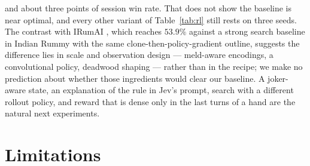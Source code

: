 \documentclass[11pt]{article}
\begin{document}
and about three points of session win rate. That does not show the baseline is near optimal, and every other variant of Table~\ref{tab:rl} still rests on three seeds. The contrast with IRumAI \cite{mohan2026}, which reaches $53.9\%$ against a strong search baseline in Indian Rummy with the same clone-then-policy-gradient outline, suggests the difference lies in scale and observation design --- meld-aware encodings, a convolutional policy, deadwood shaping --- rather than in the recipe; we make no prediction about whether those ingredients would clear our baseline. A joker-aware state, an explanation of the rule in Jev's prompt, search with a different rollout policy, and reward that is dense only in the last turns of a hand are the natural next experiments.

\section{Limitations}\label{sec:lim}
\end{document}
